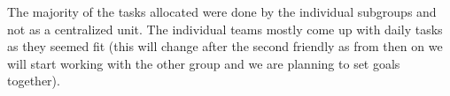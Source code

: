 The majority of the tasks allocated were done by the individual subgroups and not as a centralized unit. The individual teams mostly come up with daily tasks as they seemed fit (this will change after the second friendly as from then on we will start working with the other group and we are planning to set goals together). 